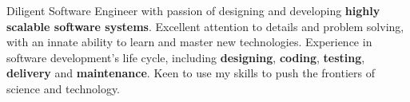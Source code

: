 

\begin{cvparagraph}

Diligent Software Engineer with passion of designing and developing \textbf{highly scalable software systems}. Excellent attention to details and problem solving, with an innate ability to learn and master new technologies. Experience in software development's life cycle, including \textbf{designing}, \textbf{coding}, \textbf{testing}, \textbf{delivery} and \textbf{maintenance}. Keen to use my skills to push the frontiers of science and technology.
\end{cvparagraph}